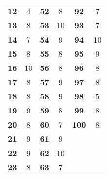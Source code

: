\documentclass{article}
\begin{document}
\begin{table}[]
\begin{tabular}{cccccc}
		\multicolumn{1}{l}{\textbf{12}} & 4                  & \multicolumn{1}{l}{\textbf{52}} & 8                  & \textbf{92}                   & 7                             \\
		\multicolumn{1}{l}{\textbf{13}} & 8                  & \multicolumn{1}{l}{\textbf{53}} & 10                 & \textbf{93}                   & 7                             \\
		\multicolumn{1}{l}{\textbf{14}} & 7                  & \multicolumn{1}{l}{\textbf{54}} & 9                  & \textbf{94}                   & 10                            \\
		\multicolumn{1}{l}{\textbf{15}} & 8                  & \multicolumn{1}{l}{\textbf{55}} & 8                  & \textbf{95}                   & 9                             \\
		\multicolumn{1}{l}{\textbf{16}} & 10                 & \multicolumn{1}{l}{\textbf{56}} & 8                  & \textbf{96}                   & 8                             \\
		\multicolumn{1}{l}{\textbf{17}} & 8                  & \multicolumn{1}{l}{\textbf{57}} & 9                  & \textbf{97}                   & 8                             \\
		\multicolumn{1}{l}{\textbf{18}} & 8                  & \multicolumn{1}{l}{\textbf{58}} & 9                  & \textbf{98}                   & 5                             \\
		\multicolumn{1}{l}{\textbf{19}} & 9                  & \multicolumn{1}{l}{\textbf{59}} & 8                  & \textbf{99}                   & 8                             \\
		\multicolumn{1}{l}{\textbf{20}} & 8                  & \multicolumn{1}{l}{\textbf{60}} & 7                  & \textbf{100}                  & 8                             \\
		\multicolumn{1}{l}{\textbf{21}} & 9                  & \multicolumn{1}{l}{\textbf{61}} & 9                  & \multicolumn{1}{l}{\textbf{}} & \multicolumn{1}{l}{\textbf{}} \\
		\multicolumn{1}{l}{\textbf{22}} & 9                  & \multicolumn{1}{l}{\textbf{62}} & 10                 & \multicolumn{1}{l}{\textbf{}} & \multicolumn{1}{l}{\textbf{}} \\
		\textbf{23}                     & 8                  & \textbf{63}                     & 7                  &                               &                               \\

\end{tabular}
\end{table}
\end{document}
